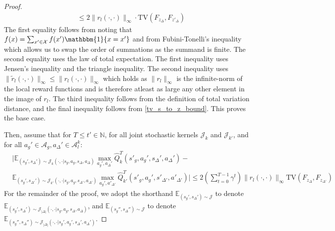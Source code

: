 \documentclass[10pt,a4paper]{amsart}
\def\E{\mathbb{E}}
\def\N{\mathbb{N}}
\begin{document}
\begin{proof}
\begin{align*}
&\leq  2\|r_l(\cdot,\cdot)\|_\infty \cdot \mathrm{TV}(F_{z_{\Delta}}, F_{z'_{\Delta}})
\end{align*}
The first equality follows from noting that $f(x)= \sum_{x'\in \mathcal{X}}f(x')\mathbbm{1}\{x=x'\}$ and from Fubini-Tonelli's inequality which allows us to swap the order of summations as the summand is finite. The second equality uses the law of total expectation. The first inequality uses Jensen's inequality and the triangle inequality. The second inequality uses $\|\tilde{r}_l(\cdot,\cdot)\|_\infty\leq \|r_l(\cdot,\cdot)\|_\infty$ which holds as $\|{r}_l\|_\infty$ is the infinite-norm of the local reward functions and is therefore atleast as large any other element in the image of $r_l$. The third inequality follows from the definition of total variation distance, and the final inequality follows from  \cref{tv_s_to_z_bound}. This proves the base case.

Then, assume that for $T\leq t'\in\N$, for all joint stochastic kernels $\mathcal{J}_k$ and $\mathcal{J}_{k'}$, and for all $a_g'\in \mathcal{A}_g, a_\Delta' \in \mathcal{A}_l^k$:
\begin{align*}
&\bigg|\E_{(s_g',s_\Delta')\sim\mathcal{J}_k(\cdot,\cdot|s_g,a_g,s_\Delta,a_\Delta)}\max_{a_g',a_\Delta'}\hat{Q}_k^T(s'_g,a_g',s_\Delta', a_\Delta')-\\
&\E_{(s_g',s_{\Delta'}')\sim\mathcal{J}_{k'}(\cdot,\cdot|s_g,a_g,s_{\Delta'}, a_{\Delta'})}\max_{a_g',a'_{\Delta'}}\hat{Q}_{k'}^T(s'_g,  a_g',s'_{\Delta'},a'_{\Delta'})\bigg| \leq 2\left (\sum_{t=0}^{T-1}\! \gamma^t\right)\!\|r_l(\cdot,\cdot)\|_\infty \mathrm{TV}(F_{z_\Delta}, F_{z_{\Delta'}})
\end{align*}
For the remainder of the proof, we adopt the shorthand $\E_{(s_g',s_\Delta')\sim{\mathcal{J}}}$ to denote $\E_{(s_g',s_\Delta')\sim\mathcal{J}_{|\Delta|}(\cdot,\cdot|s_g,a_g,s_\Delta,  a_\Delta)}$, and $\E_{(s_g'',s_\Delta'')\sim{\mathcal{J}}}$ to denote $\E_{(s_g'',s_\Delta'')\sim\mathcal{J}_{|\Delta|}(\cdot,\cdot|s_g',a_g',s_\Delta', a_\Delta')}$. 


\end{proof}
\end{document}
